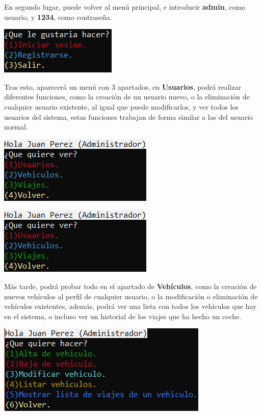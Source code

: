 \newpage

En segundo lugar, puede volver al menú principal, e introducir \textbf{admin}, como usuario, y \textbf{1234}, como contraseña. 
\begin{center}
    \includegraphics[]{FOTOS/menuPrincipal.png}
\end{center}

Tras esto, aparecerá un menú con 3 apartados, en \textbf{Usuarios}, podrá realizar diferentes funciones, como la creación de un usuario nuevo, o la eliminación de cualquier usuario existente,
al igual que puede modificarlos, y ver todos los usuarios del sistema, estas funciones trabajan de forma similar a las del usuario normal. 
\begin{center}
    \begin{center}
      \includegraphics[]{FOTOS/menuAdmin.png}
    \end{center}
    \begin{center}
      \includegraphics[]{FOTOS/menuAdmin.png}
    \end{center}
\end{center}

\newpage

Más tarde, podrá probar todo en el apartado de \textbf{Vehículos}, como la creación de nuevos vehículos al perfil de cualquier usuario, o la modificación o eliminación de vehículos existentes,
además, podrá ver una lista con todos los vehículos que hay en el sistema, o incluso ver un historial de los viajes que ha hecho un coche. 
\begin{center}
  \includegraphics[]{FOTOS/menuAdminVehiculo.png}
\end{center}

